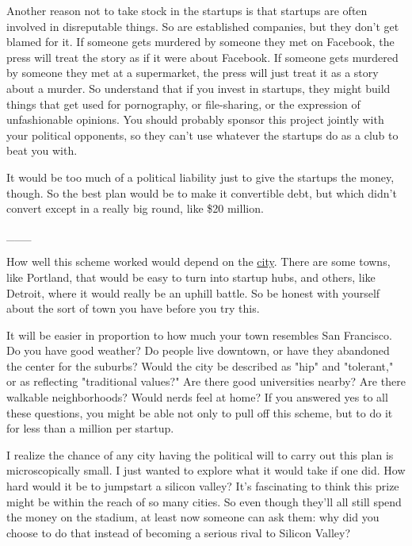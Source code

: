 Another reason not to
                  take stock in the startups is that startups are often involved
                  in disreputable things. So are established companies, but they
                  don't get blamed for it. If someone gets murdered by someone
                  they met on Facebook, the press will treat the story as if it
                  were about Facebook. If someone gets murdered by someone they
                  met at a supermarket, the press will just treat it as a story
                  about a murder. So understand that if you invest in startups,
                  they might build things that get used for pornography, or
                  file-sharing, or the expression of unfashionable opinions. You
                  should probably sponsor this project jointly with your
                  political opponents, so they can't use whatever the startups
                  do as a club to beat you with.

It would be too much
                  of a political liability just to give the startups the money,
                  though. So the best plan would be to make it convertible debt,
                  but which didn't convert except in a really big round, like
                  \$20 million.


                  \_\_\_
                  

How well this scheme worked would depend on the
                  \href{http://www.paulgraham.com/cities.html}{city}. There are some towns, like
                  Portland, that would be easy to turn into startup hubs, and
                  others, like Detroit, where it would really be an uphill
                  battle. So be honest with yourself about the sort of town you
                  have before you try this.

It will be easier in
                  proportion to how much your town resembles San Francisco. Do
                  you have good weather? Do people live downtown, or have they
                  abandoned the center for the suburbs? Would the city be
                  described as "hip" and "tolerant," or as reflecting
                  "traditional values?" Are there good universities nearby? Are
                  there walkable neighborhoods? Would nerds feel at home? If you
                  answered yes to all these questions, you might be able not
                  only to pull off this scheme, but to do it for less than a
                  million per startup.

I realize the chance of any
                  city having the political will to carry out this plan is
                  microscopically small. I just wanted to explore what it would
                  take if one did. How hard would it be to jumpstart a silicon
                  valley? It's fascinating to think this prize might be within
                  the reach of so many cities. So even though they'll all still
                  spend the money on the stadium, at least now someone can ask
                  them: why did you choose to do that instead of becoming a
                  serious rival to Silicon Valley?






